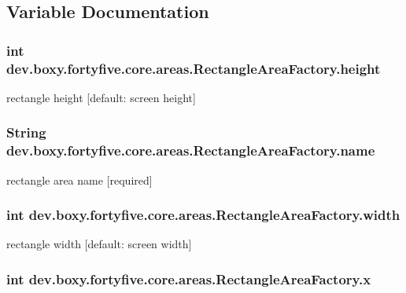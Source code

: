 \subsection{Variable Documentation}
\hypertarget{group___rectangle_area_gaa7b0ba57b53529eb79a8d671cce6e073}{
\subsubsection[{height}]{\setlength{\rightskip}{0pt plus 5cm}int {\bf dev.boxy.fortyfive.core.areas.RectangleAreaFactory.height}}}
\label{db/d94/group___rectangle_area_gaa7b0ba57b53529eb79a8d671cce6e073}
rectangle height \mbox{[}default: screen height\mbox{]} \hypertarget{group___rectangle_area_gaa9dd1bb57ebf508cd2a50260ef3094cc}{
\subsubsection[{name}]{\setlength{\rightskip}{0pt plus 5cm}String {\bf dev.boxy.fortyfive.core.areas.RectangleAreaFactory.name}}}
\label{db/d94/group___rectangle_area_gaa9dd1bb57ebf508cd2a50260ef3094cc}
rectangle area name \mbox{[}required\mbox{]} \hypertarget{group___rectangle_area_ga4eef08a509ab1d413d231624d4625eb2}{
\subsubsection[{width}]{\setlength{\rightskip}{0pt plus 5cm}int {\bf dev.boxy.fortyfive.core.areas.RectangleAreaFactory.width}}}
\label{db/d94/group___rectangle_area_ga4eef08a509ab1d413d231624d4625eb2}
rectangle width \mbox{[}default: screen width\mbox{]} \hypertarget{group___rectangle_area_gae77066a4844139558dd4e05beb887764}{
\subsubsection[{x}]{\setlength{\rightskip}{0pt plus 5cm}int {\bf dev.boxy.fortyfive.core.areas.RectangleAreaFactory.x}}}
